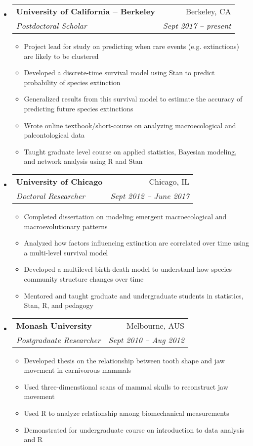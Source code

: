 \documentclass[letterpaper,11pt]{article}
\makeatletter
\newcommand{\resitem}[1]{\item #1 \vspace{-2pt}}
\newcommand{\ressubheading}[4]{
  \begin{tabular*}{6.5in}{l@{\extracolsep{\fill}}r}
    \textbf{#1} & #2 \\
    \textit{#3} & \textit{#4} \\
\end{tabular*}\vspace{-6pt}}
\makeatother
\begin{document}
\begin{itemize}
  \item 
    \ressubheading{University of California -- Berkeley}{Berkeley, CA}{Postdoctoral Scholar}{Sept 2017 -- present}
    { \footnotesize
      \begin{itemize}
          \resitem{Project lead for study on predicting when rare events (e.g. extinctions) are likely to be clustered }
          \resitem{Developed a discrete-time survival model using Stan to predict probability of species extinction }
          \resitem{Generalized results from this survival model to estimate the accuracy of predicting future species extinctions }
          \resitem{Wrote online textbook/short-course on analyzing macroecological and paleontological data }
          \resitem{Taught graduate level course on applied statistics, Bayesian modeling, and network analysis using R and Stan }
      \end{itemize}
    }
  \item 
    \ressubheading{University of Chicago}{Chicago, IL}{Doctoral Researcher}{Sept 2012 -- June 2017}
    { \footnotesize
      \begin{itemize}
          \resitem{Completed dissertation on modeling emergent macroecological and macroevolutionary patterns }
          \resitem{Analyzed how factors influencing extinction are correlated over time using a multi-level survival model }
          \resitem{Developed a multilevel birth-death model to understand how species community structure changes over time }
          \resitem{Mentored and taught graduate and undergraduate students in statistics, Stan, R, and pedagogy }
      \end{itemize}
    }
		\item 
			\ressubheading{Monash University}{Melbourne, AUS}{Postgraduate Researcher}{Sept 2010 -- Aug 2012}
				{ \footnotesize
				\begin{itemize}
            \resitem{Developed thesis on the relationship between tooth shape and jaw movement in carnivorous mammals }
            \resitem{Used three-dimenstional scans of mammal skulls to reconstruct jaw movement }
            \resitem{Used R to analyze relationship among biomechanical measurements }
            \resitem{Demonstrated for undergraduate course on introduction to data analysis and R }

\end{itemize}}
\end{itemize}
\end{document}
